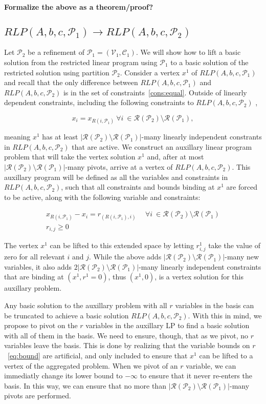\documentclass[runningheads]{llncs}
\newcommand{\cP}{{\mathcal P}}
\newcommand{\cC}{{\mathcal C}}
\newcommand{\cV}{{\mathcal V}}
\newcommand{\cR}{{\mathcal R}}
\begin{document}
{\bf Formalize the above as a theorem/proof?}


\subsection{$RLP(A,b,c,\cP_1) \rightarrow RLP(A,b,c,\cP_2)$}


Let $\cP_2$ be a refinement of $\cP_1 = (\cV_1, \cC_1)$. We will show how to lift a basic solution from the restricted linear program using $\cP_1$ to a basic solution of the restricted solution using partition $\cP_2$. Consider a vertex $x^1$ of $RLP(A,b,c,\cP_1)$ and recall that the only difference between $RLP(A,b,c,\cP_1)$ and $RLP(A,b,c,\cP_2)$ is in the set of constraints~\eqref{cons:equal}. Outside of linearly dependent constraints, including the following constraints to $RLP(A,b,c,\cP_2)$ ,

$$ x_i = x_{R(i,\cP_1)} \ \forall i\ \in \cR(\cP_2) \setminus \cR(\cP_1),$$

\noindent meaning $x^1$ has at least $|\cR(\cP_2) \setminus \cR(\cP_1)|$-many linearly independent constrants in $RLP(A,b,c,\cP_2)$ that are active. We construct an auxillary linear program problem that will take the vertex solution $x^1$ and, after at most $|\cR(\cP_2) \setminus \cR(\cP_1)|$-many pivots, arrive at a vertex of  $RLP(A,b,c,\cP_2)$. This auxillary program will be defined as all the variables and constraints in $RLP(A,b,c,\cP_2)$, such that all constraints and bounds binding at $x^1$ are forced to be active, along with the following variable and constraints:

\begin{align}
x_{R(i,\cP_1)}  - x_i = r_{(R(i,\cP_1), i) } &\ \  \forall i\ \in \cR(\cP_2) \setminus \cR(\cP_1) \label{eq:linking}\\
r_{i,j} \geq 0 \label{eq:bound}
\end{align}

\noindent The vertex $x^1$ can be lifted to this extended space by letting $r_{i,j}^1$ take the value of zero for all relevant $i$ and $j$. While the above adds $|\cR(\cP_2) \setminus \cR(\cP_1)|$-many new variables, it also adds $2|\cR(\cP_2) \setminus \cR(\cP_1)|$-many linearly independent constraints that are binding at $(x^1,r^1=0)$, thus $(x^1,0)$, is a vertex solution for this auxillary problem.  


Any basic solution to the auxillary problem with all $r$ variables in the basis can be truncated to achieve a basic solution $RLP(A,b,c,\cP_2)$. With this in mind, we propose to pivot on the $r$ variables in the auxillary LP to find a basic solution with all of them in the basis. We need to ensure, though, that as we pivot, no $r$ variables leave the basis. This is done by realizing that the variable bounds on $r$~\eqref{eq:bound} are artificial, and only included to ensure that $x^1$ can be lifted to a vertex of the aggregated problem. When we pivot of an $r$ variable, we can immediatly change its lower bound to $-\infty$ to ensure that it never re-enters the basis. In this way, we can ensure that no more than $|\cR(\cP_2) \setminus \cR(\cP_1)|$-many pivots are performed. 
\end{document}
